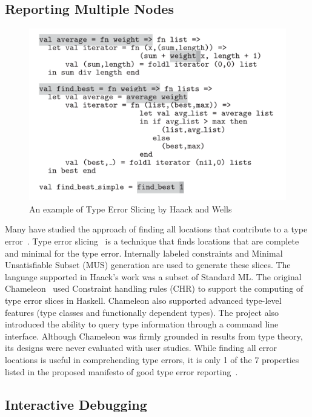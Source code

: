 \subsection{Reporting Multiple Nodes}

\begin{figure}[hbt]
    \includegraphics[width=0.6\linewidth]{HaackTypeErrorSlicing}
    \caption{An example of Type Error Slicing by Haack and Wells
    }
\end{figure}

Many have studied the approach of finding all locations that contribute to a type error~\cite{Stuckey2003-pz, Haack2004-fr, Pavlinovic2015-ke, Schilling2012-iq}. Type error slicing~\cite{Haack2004-fr} is a technique that finds locations that are complete and minimal for the type error. Internally labeled constraints and Minimal Unsatisfiable Subset (MUS) generation are used to generate these slices. The language supported in Haack's work was a subset of Standard ML. The original Chameleon~\cite{Stuckey2003-pz} used  Constraint handling rules (CHR) to support the computing of type error slices in Haskell. Chameleon also supported advanced type-level features (type classes and functionally dependent types). The project also introduced the ability to query type information through a command line interface. Although Chameleon was firmly grounded in results from type theory, its designs were never evaluated with user studies. While finding all error locations is useful in comprehending type errors, it is only 1 of the 7 properties listed in the proposed manifesto of good type error reporting~\cite{Yang2000-wn}.

\subsection{Interactive Debugging}


